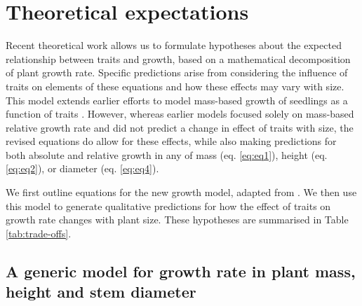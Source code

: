 \documentclass[a4paper,11pt]{article}
\begin{document}
\section*{Theoretical expectations}\label{theory}

Recent theoretical work \citep{Falster:2011ii} allows us to formulate hypotheses about the expected relationship between traits and growth, based on a mathematical decomposition of plant growth rate. Specific predictions arise from considering the influence of traits on elements of these equations and how these effects may vary with size. This model extends earlier efforts to model mass-based growth of seedlings as a function of traits \citep{Lambers:1992bj,Cornelissen:1996hf,Wright:2000kw,Enquist:2007ek}. However, whereas earlier models focused solely on mass-based relative growth rate and did not predict a change in effect of traits with size, the revised equations do allow for these effects, while also making predictions for both absolute and relative growth in any of mass (eq. \ref{eq:eq1}), height (eq. \ref{eq:eq2}), or diameter (eq. \ref{eq:eq4}).

We first outline equations for the new growth model, adapted from \citet{Falster:2011ii}. We then use this model to generate qualitative predictions for how the effect of traits on growth rate changes with plant size. These hypotheses are summarised in Table \ref{tab:trade-offs}.

\subsection*{A generic model for growth rate in plant mass, height and stem diameter}\label{sec:growth}
\end{document}
